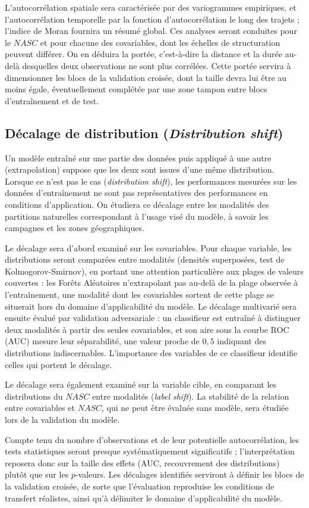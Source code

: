 L'autocorrélation spatiale sera caractérisée par des variogrammes empiriques, et l'autocorrélation temporelle par la fonction d'autocorrélation le long des trajets ; l'indice de Moran fournira un résumé global. Ces analyses seront conduites pour le $NASC$ et pour chacune des covariables, dont les échelles de structuration peuvent différer. On en déduira la portée, c'est-à-dire la distance et la durée au-delà desquelles deux observations ne sont plus corrélées. Cette portée servira à dimensionner les blocs de la validation croisée, dont la taille devra lui être au moins égale, éventuellement complétée par une zone tampon entre blocs d'entraînement et de test.

\subsection{Décalage de distribution (\textit{Distribution shift})}
\label{subsection:distribution_shift}
Un modèle entraîné sur une partie des données puis appliqué à une autre (extrapolation) suppose que les deux sont issues d'une même distribution. Lorsque ce n'est pas le cas (\textit{distribution shift}), les performances mesurées sur les données d'entraînement ne sont pas représentatives des performances en conditions d'application. On étudiera ce décalage entre les modalités des partitions naturelles correspondant à l'usage visé du modèle, à savoir les campagnes et les zones géographiques.

Le décalage sera d'abord examiné sur les covariables. Pour chaque variable, les distributions seront comparées entre modalités (densités superposées, test de Kolmogorov-Smirnov), en portant une attention particulière aux plages de valeurs couvertes : les Forêts Aléatoires n'extrapolant pas au-delà de la plage observée à l'entraînement, une modalité dont les covariables sortent de cette plage se situerait hors du domaine d'applicabilité du modèle. Le décalage multivarié sera ensuite évalué par validation adversariale : un classifieur est entraîné à distinguer deux modalités à partir des seules covariables, et son aire sous la courbe ROC (AUC) mesure leur séparabilité, une valeur proche de $0{,}5$ indiquant des distributions indiscernables. L'importance des variables de ce classifieur identifie celles qui portent le décalage.

Le décalage sera également examiné sur la variable cible, en comparant les distributions du $NASC$ entre modalités (\textit{label shift}). La stabilité de la relation entre covariables et $NASC$, qui ne peut être évaluée sans modèle, sera étudiée lors de la validation du modèle.

Compte tenu du nombre d'observations et de leur potentielle autocorrélation, les tests statistiques seront presque systématiquement significatifs ; l'interprétation reposera donc sur la taille des effets (AUC, recouvrement des distributions) plutôt que sur les $p$-valeurs. Les décalages identifiés serviront à définir les blocs de la validation croisée, de sorte que l'évaluation reproduise les conditions de transfert réalistes, ainsi qu'à délimiter le domaine d'applicabilité du modèle.